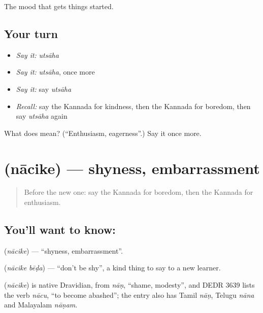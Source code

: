 \begin{grammarlens}[title={What you've built}]
The mood that gets things started.
\end{grammarlens}

\subsection*{Your turn}
\begin{itemize}
\raggedright
  \item \emph{Say it:} \emph{utsāha}
  \item \emph{Say it:} \emph{utsāha}, once more
  \item \emph{Say it:} say \emph{utsāha}
  \item \emph{Recall:} say the Kannada for kindness, then the Kannada for boredom, then say \emph{utsāha} again
\end{itemize}

\begin{tcolorbox}[breakable,colback=teal!4,colframe=teal!35!black,title={Before you move on}]
What does  mean? (\textquotedblleft{}Enthusiasm, eagerness\textquotedblright{}.) Say it once more.
\end{tcolorbox}
\section[\texorpdfstring{\kn{ನಾಚಿಕೆ} (nācike)}{ನಾಚಿಕೆ (nācike)}]{ (nācike) — shyness, embarrassment}

\label{lesson:KA-C98-shyness}



\begin{quote}
Before the new one: say the Kannada for boredom, then the Kannada for enthusiasm.
\end{quote}

\subsection*{You'll want to know: }
\textbf{} (\emph{nācike}) — \textquotedblleft{}shyness, embarrassment\textquotedblright{}.

\textbf{ } (\emph{nācike bēḍa}) — \textquotedblleft{}don't be shy\textquotedblright{}, a kind thing to say to a new learner.

\begin{cousinweb}
\textbf{} (\emph{nācike}) is native Dravidian, from \emph{nāṇ}, \textquotedblleft{}shame, modesty\textquotedblright{}, and DEDR 3639 lists the verb \emph{nācu}, \textquotedblleft{}to become abashed\textquotedblright{}; the entry also has Tamil \emph{nāṇ}, Telugu \emph{nāna} and Malayalam \emph{nāṇam}.
\end{cousinweb}

